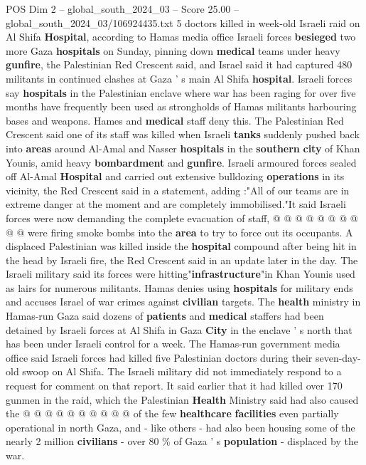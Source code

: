 \begin{textsample}{POS Dim 2 – global\_south\_2024\_03 – Score 25.00 – global\_south\_2024\_03/106924435.txt}  \label{ex:f2_pos_018}
5 doctors killed in week-old Israeli raid on Al Shifa \textbf{Hospital}, according to Hamas media office Israeli forces \textbf{besieged} two more Gaza \textbf{hospitals} on Sunday, pinning down \textbf{medical} teams under heavy \textbf{gunfire}, the Palestinian Red Crescent said, and Israel said it had captured 480 militants in continued clashes at Gaza ' s main Al Shifa \textbf{hospital}.
Israeli forces say \textbf{hospitals} in the Palestinian enclave where war has been raging for over five months have frequently been used as strongholds of Hamas militants harbouring bases and weapons.
Hames and \textbf{medical} staff deny this.
The Palestinian Red Crescent said one of its staff was killed when Israeli \textbf{tanks} suddenly pushed back into \textbf{areas} around Al-Amal and Nasser \textbf{hospitals} in the \textbf{southern} \textbf{city} of Khan Younis, amid heavy \textbf{bombardment} and \textbf{gunfire}.
Israeli armoured forces sealed off Al-Amal \textbf{Hospital} and carried out extensive bulldozing \textbf{operations} in its vicinity, the Red Crescent said in a statement, adding :"All of our teams are in extreme danger at the moment and are completely immobilised."It said Israeli forces were now demanding the complete evacuation of staff, @ @ @ @ @ @ @ @ @ @ were firing smoke bombs into the \textbf{area} to try to force out its occupants.
A displaced Palestinian was killed inside the \textbf{hospital} compound after being hit in the head by Israeli fire, the Red Crescent said in an update later in the day.
The Israeli military said its forces were hitting"\textbf{infrastructure}"in Khan Younis used as lairs for numerous militants.
Hamas denies using \textbf{hospitals} for military ends and accuses Israel of war crimes against \textbf{civilian} targets.
The \textbf{health} ministry in Hamas-run Gaza said dozens of \textbf{patients} and \textbf{medical} staffers had been detained by Israeli forces at Al Shifa in Gaza \textbf{City} in the enclave ' s north that has been under Israeli control for a week.
The Hamas-run government media office said Israeli forces had killed five Palestinian doctors during their seven-day-old swoop on Al Shifa.
The Israeli military did not immediately respond to a request for comment on that report.
It said earlier that it had killed over 170 gunmen in the raid, which the Palestinian \textbf{Health} Ministry said had also caused the @ @ @ @ @ @ @ @ @ @ of the few \textbf{healthcare} \textbf{facilities} even partially operational in north Gaza, and - like others - had also been housing some of the nearly 2 million \textbf{civilians} - over 80 \% of Gaza ' s \textbf{population} - displaced by the war.

\end{textsample}
